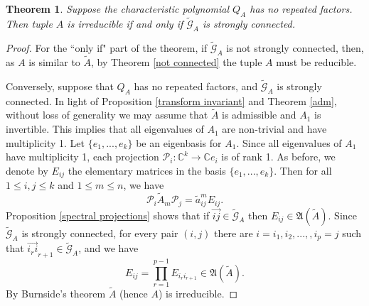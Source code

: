 \documentclass[draft, 12pt, reqno]{amsart}
\newcommand{\C}{{\mathbb C}}
\numberwithin{equation}{section}
\theoremstyle{plain}
\newtheorem{theorem}{Theorem}[section]
\begin{document}
\begin{theorem}\label{graph connected}
Suppose the characteristic polynomial $Q_A$ has no repeated factors. Then tuple $A$ is irreducible if and only if $\widetilde{\mathcal{G}}_A$ is strongly connected.	
\end{theorem}
\begin{proof}
For the ``only if" part of the theorem, if $\widetilde{\mathcal{G}}_A$ is not strongly connected, then, as $A$ is similar to $\widetilde{A}$, by Theorem \ref{not connected} the tuple $A$ must be reducible.

Conversely, suppose that $Q_A$ has no repeated factors, and $\widetilde{\mathcal{G}}_A$ is strongly connected. In light of Proposition \ref{transform invariant} and Theorem \ref{adm}, without loss of generality we may assume that $\widetilde{A}$ is admissible and $A_1$ is invertible. This implies that all eigenvalues of $A_1$ are non-trivial and have multiplicity 1. Let $\{e_1,...,e_k\}$ be an eigenbasis for $A_1$. Since all eigenvalues of $A_1$ have multiplicity 1, each projection $\mathcal{P}_i:\C^k\to \C e_i$ is of rank 1. As before, we denote by $E_{ij}$ the elementary matrices in the basis $\{e_1,...,e_k\}$. Then for all $1\leq i,j \leq k$ and $1\leq m\leq n$, we have $$\mathcal{P}_i \widetilde{A}_m\mathcal{P}_j=\widetilde{a}_{ij}^m E_{ij}. $$
Proposition \ref{spectral projections} shows that if $\overrightarrow{ij}\in \widetilde{\mathcal{G}}_A$ then $E_{ij}\in \mathfrak{A}(\widetilde{A})$. Since $\widetilde{\mathcal{G}}_A$ is strongly connected, for every pair $(i, j)$ there are $i=i_1, i_2,...,,i_p=j$ such that $\overrightarrow{i_ri}_{r+1}\in \widetilde{\mathcal{G}}_A$, and we have
$$E_{ij}=\displaystyle \prod_{r=1}^{p-1}E_{i_r i_{r+1}}\in \mathfrak{A}(\widetilde{A}). $$ 
By Burnside's theorem $\widetilde{A}$ (hence $A$) is irreducible.
\end{proof}
\end{document}
